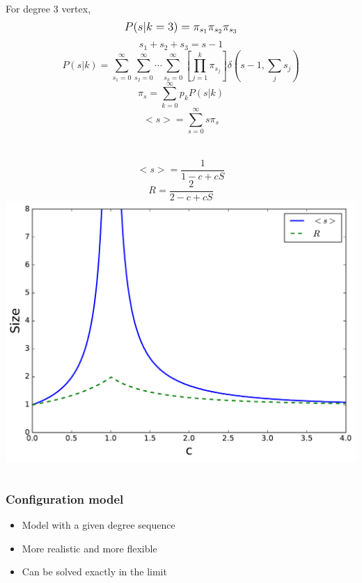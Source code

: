 \documentclass{beamer}
\begin{document}
\begin{frame}
    \frametitle{}
For degree $3$ vertex, 
    $$\mathlarger{P(s|k=3) = \pi_{s_1}\pi_{s_2}\pi_{s_3}}$$
    $$s_1 + s_2 + s_3 = s-1$$
\pause
\justifying
$$P(s|k) = \sum\limits_{s_1=0}^{\infty}\sum\limits_{s_2=0}^{\infty}\cdots\sum\limits_{s_k=0}^{\infty}\left[\prod\limits_{j=1}^k\pi_{s_j}\right]\delta(s-1, \sum\limits_js_j)$$
\pause
$$\pi_s = \sum\limits_{k=0}^{\infty}p_kP(s|k)$$
$$<s> = \sum\limits_{s=0}^\infty s\pi_s$$
\end{frame}
\begin{frame}
    \frametitle{}
    \begin{columns}
    $$<s> = \frac{1}{1-c+cS}$$
        \vspace{2em}
        \pause
    $$R = \frac{2}{2-c+cS}$$
    \centering
        \pause
        \includegraphics[width=\columnwidth]{average_small_comp.pdf}
    \end{columns}
\end{frame}
\begin{frame}
    \frametitle{Configuration model}
    \centering
    \begin{itemize}
    \setlength\itemsep{1em}
        \item{Model with a given degree sequence}
        \item{More realistic and more flexible}
        \item{Can be solved exactly in the limit}
    \end{itemize}
\end{frame}
\end{document}
